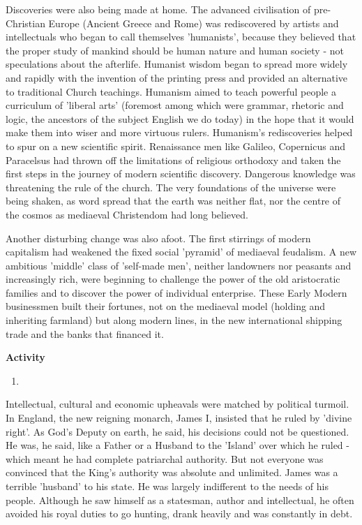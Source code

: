 			Discoveries were also being made at home. The advanced civilisation of pre-Christian Europe (Ancient Greece and Rome) was rediscovered by artists and intellectuals who began to call themselves 'humanists', because they believed that the proper study of mankind should be human nature and human society - not speculations about the afterlife. Humanist wisdom began to spread more widely and rapidly with the invention of the printing press and provided an alternative to traditional Church teachings. Humanism aimed to teach powerful people a curriculum of 'liberal arts' (foremost among which were grammar, rhetoric and logic, the ancestors of the subject English we do today) in the hope that it would make them into wiser and more virtuous rulers. Humanism's rediscoveries helped to spur on a new scientific spirit. Renaissance men like Galileo, Copernicus and Paracelsus had thrown off the limitations of religious orthodoxy and taken the first steps in the journey of modern scientific discovery. Dangerous knowledge was threatening the rule of the church. The very foundations of the universe were being shaken, as word spread that the earth was neither flat, nor the centre of the cosmos as mediaeval Christendom had long believed.

			Another disturbing change was also afoot. The first stirrings of modern capitalism had weakened the fixed social 'pyramid' of mediaeval feudalism. A new ambitious 'middle' class of 'self-made men', neither landowners nor peasants and increasingly rich, were beginning to challenge the power of the old aristocratic families and to discover the power of individual enterprise. These Early Modern businessmen built their fortunes, not on the mediaeval model (holding and inheriting farmland) but along modern lines, in the new international shipping trade and the banks that financed it.

			\textbf{Activity}
				\begin{enumerate}
					\item 
				\end{enumerate}

			Intellectual, cultural and economic upheavals were matched by political turmoil. In England, the new reigning monarch, James I, insisted that he ruled by 'divine right'. As God's Deputy on earth, he said, his decisions could not be questioned. He was, he said, like a Father or a Husband to the 'Island' over which he ruled - which meant he had complete patriarchal authority. But not everyone was convinced that the King's authority was absolute and unlimited. James was a terrible 'husband' to his state. He was largely indifferent to the needs of his people. Although he saw himself as a statesman, author and intellectual, he often avoided his royal duties to go hunting, drank heavily and was constantly in debt.

